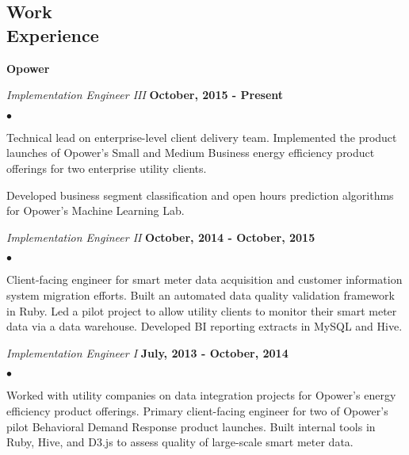 \documentclass[margin,line]{res}
\newenvironment{list2}{
  \begin{list}{$\bullet$}{%
      \setlength{\itemsep}{0in}
      \setlength{\parsep}{0in} \setlength{\parskip}{0in}
      \setlength{\topsep}{0in} \setlength{\partopsep}{0in}
      \setlength{\leftmargin}{0.2in}}}{\end{list}}
\begin{document}
\begin{resume}
\section{\sc Work \\ Experience}

{\bf Opower}

\vspace{-.3cm}
{\em Implementation Engineer III} \hfill {\bf October, 2015 - Present}\\

\vspace*{-5mm}
\vspace*{2mm}
\begin{list2}
\item Technical lead on enterprise-level client delivery team.
  Implemented the product launches of Opower's Small and Medium
  Business energy efficiency product offerings for two enterprise
  utility clients.
\item Developed business segment classification and open hours
  prediction algorithms for Opower's Machine Learning Lab.
\end{list2}
\vspace{-.3cm}
{\em Implementation Engineer II} \hfill {\bf October, 2014 - October, 2015}\\

\vspace*{-5mm}
\vspace*{2mm}
\begin{list2}
\item Client-facing engineer for smart meter data acquisition and
  customer information system migration efforts.  Built an automated
  data quality validation framework in Ruby.  Led a pilot project to
  allow utility clients to monitor their smart meter data via a data
  warehouse.  Developed BI reporting extracts in MySQL and Hive.

\end{list2}

\vspace{-.3cm}
{\em Implementation Engineer I} \hfill {\bf July, 2013 - October, 2014}\\
\vspace*{-5mm}
\vspace*{2mm}
\begin{list2}
\item Worked with utility companies on data integration projects for
  Opower's energy efficiency product offerings.  Primary client-facing
  engineer for two of Opower's pilot Behavioral Demand Response
  product launches. Built internal tools in Ruby, Hive, and D3.js to
  assess quality of large-scale smart meter data.
\end{list2}


\end{resume}
\end{document}
